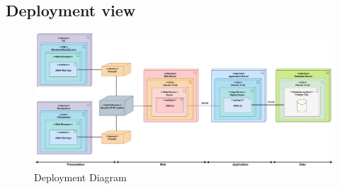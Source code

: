 \documentclass[table, 12pt]{article}
\begin{document}
\newpage

\subsection{Deployment view}
\begin{center}
    \begin{figure}[H]
        \includegraphics[scale=0.35, center]{assets/archimate.png}
        \caption{Deployment Diagram}
        \label{fig: deployment_diagram}
    \end{figure}
\end{center}
\end{document}
